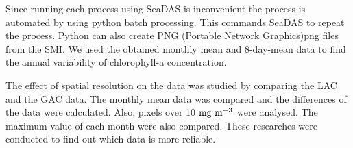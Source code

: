 Since running each process using SeaDAS is inconvenient the process is automated by using python batch processing. This commands SeaDAS to repeat the process. Python can also create PNG (Portable Network Graphics)png files from the SMI. We used the obtained monthly mean and 8-day-mean data to find the annual variability of chlorophyll-a concentration.

The effect of spatial resolution on the data was studied by comparing the LAC and the GAC data. The monthly mean data was compared and the differences of the data were calculated. Also, pixels over 10 $\rm mg~m^{-3}$ were analysed. The maximum value of each month were also compared. These researches were conducted to find out which data is more reliable.